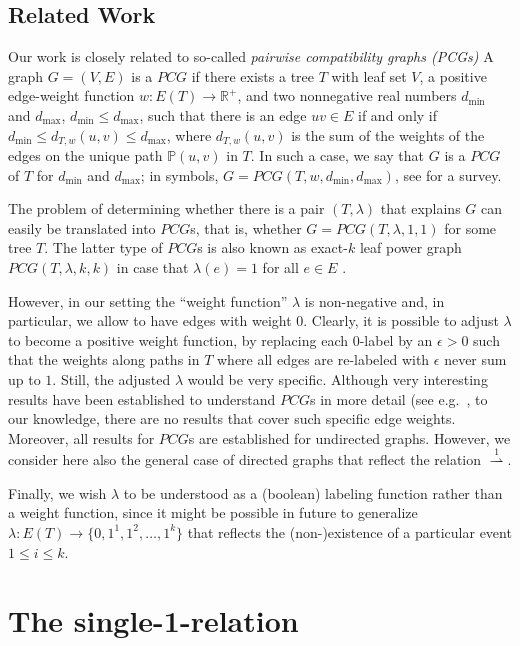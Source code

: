 \documentclass[smallextended]{svjour3}
\let\cite\citep
\newcommand{\rev}[1]{\begingroup\color{blue}#1\endgroup}
\newcommand{\Rld}{\mathrel{\overset{1}{\rightharpoonup}}}
\begin{document}
\rev{
\subsection{Related Work}

Our work is closely related to so-called \emph{pairwise compatibility graphs (PCGs)}
A graph $G = (V, E)$ is a $PCG$ if there exists a tree
$T$ with leaf set $V$, a positive edge-weight function $w:E(T)\to \mathbb{R}^+$, 
and two nonnegative real numbers $d_{\min}$
and $d_{\max}$, $d_{\min}\leq d_{\max}$,
such that there is an edge $uv \in  E$ if and only if 
 $d_{\min}\leq d_{T,w}(u , v ) \leq d_{\max}$, where
$d_{T,w}(u , v )$ is the sum of the weights of the edges on the unique path 
$\mathbb{P}(u,v)$ in $T$. In such a case, we say that $G$ is a $PCG$ of $T$ for 
$d_{\min}$ and $d_{\max}$; in symbols, $G = PCG(T, w, d_{\min} , d_{\max})$, see 
\cite{PCGsurvey} for a survey.

The problem of determining whether there is a pair $(T,\lambda)$ that explains
$G$ can easily be translated into $PCG$s, that is, whether 
$G = PCG(T, \lambda, 1 , 1)$ for some tree $T$. The latter type of $PCG$s
is also known as exact-$k$ leaf power graph $PCG(T, \lambda, k, k)$ in case that 
$\lambda(e)=1$ for all $e\in E$ \cite{BVR:10}.

However, in our setting the 
``weight function'' $\lambda$ is non-negative and, in particular, we allow to have
edges with weight $0$. Clearly, it is possible to
adjust $\lambda$ to become a positive weight function, by replacing each $0$-label
by an $\epsilon>0$ such that the weights along paths in $T$ where all edges are
re-labeled with $\epsilon$ never sum up to $1$. Still, the adjusted $\lambda$
would be very specific. Although very interesting results have been established
to understand $PCG$s in more detail (see e.g.\ \cite{PCGsurvey,YHTR:08,YBR:10,CMPS:13,MR:13,DMR:13},
to our knowledge, there are no results that cover such specific edge weights. 
Moreover, all results for $PCG$s are established for undirected graphs.
However, we consider here also the general case of directed graphs that reflect the relation $\Rld$. 

Finally, we wish  $\lambda$ to be understood as a (boolean) labeling function rather than a weight
function, since it might be possible in future to generalize $\lambda: E(T) \to \{0,1^1,1^2,\dots,1^k\}$
that reflects the (non-)existence of a particular event $1\leq i \leq k$. 
}



\section{The single-1-relation}
\end{document}
